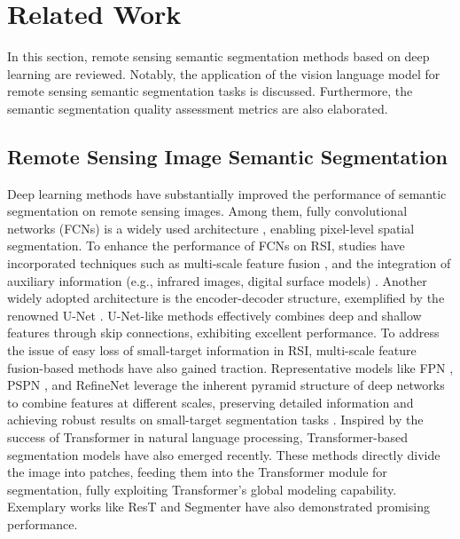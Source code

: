 \section{Related Work}
\label{sec:related_work}
  
  In this section, remote sensing semantic segmentation methods based on deep learning are reviewed. Notably, the application of the vision language model for remote sensing semantic segmentation tasks is discussed. Furthermore, the semantic segmentation quality assessment metrics are also elaborated.

\subsection{Remote Sensing Image Semantic Segmentation}\label{section RSss}
Deep learning methods have substantially improved the performance of semantic segmentation on remote sensing images. Among them, fully convolutional networks (FCNs) is a widely used architecture \cite{9076866}, enabling pixel-level spatial segmentation. To enhance the performance of FCNs on RSI, studies have incorporated techniques such as multi-scale feature fusion \cite{chen2017deeplab}, and the integration of auxiliary information (e.g., infrared images, digital surface models) \cite{kniaz2019deep}. Another widely adopted architecture is the encoder-decoder structure, exemplified by the renowned U-Net \cite{ronneberger2015u}. U-Net-like methods \cite{wang2022unetformer,rs16162930,9487010,wang2022novel} effectively combines deep and shallow features through skip connections, exhibiting excellent performance. To address the issue of easy loss of small-target information in RSI, multi-scale feature fusion-based methods have also gained traction. Representative models like FPN \cite{song2020semantic}, PSPN \cite{zhao2017pyramid}, and RefineNet \cite{lin2017refinenet} leverage the inherent pyramid structure of deep networks to combine features at different scales, preserving detailed information and achieving robust results on small-target segmentation tasks \cite{guo2020multi,cui2020sanet}.
Inspired by the success of Transformer in natural language processing, Transformer-based segmentation models have also emerged recently. These methods directly divide the image into patches, feeding them into the Transformer module for segmentation, fully exploiting Transformer's global modeling capability. Exemplary works like ResT \cite{zhang2021rest} and Segmenter \cite{strudel2021segmenter} have also demonstrated promising performance.

